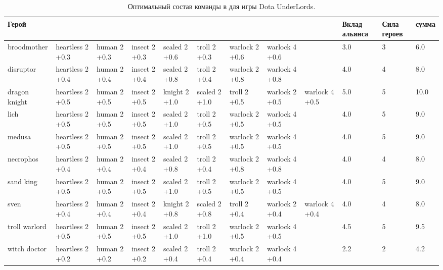 \documentclass{article}
\begin{document}
\begin{table}
\resizebox{16cm}{!} {
\begin{tabular}{l| *{8}{p{1.6cm}} | *{3}{ p{1cm}} }
{Герой} &                   &               &                &                &                &                  &                  &                  &  Вклад альянса &  Сила героев &   сумма \\
\midrule
broodmother   &  heartless 2 +0.3  &  human 2 +0.3  &  insect 2 +0.3  &  scaled 2 +0.6  &   troll 2 +0.3  &  warlock  2 +0.6  &  warlock  4 +0.6  &                   &                  3.0 &           3 &   6.0 \\
disruptor     &  heartless 2 +0.4  &  human 2 +0.4  &  insect 2 +0.4  &  scaled 2 +0.8  &   troll 2 +0.4  &  warlock  2 +0.8  &  warlock  4 +0.8  &                   &                  4.0 &           4 &   8.0 \\
dragon knight &  heartless 2 +0.5  &  human 2 +0.5  &  insect 2 +0.5  &  knight 2 +1.0  &  scaled 2 +1.0  &     troll 2 +0.5  &  warlock  2 +0.5  &  warlock  4 +0.5  &                  5.0 &           5 &  10.0 \\
lich          &  heartless 2 +0.5  &  human 2 +0.5  &  insect 2 +0.5  &  scaled 2 +1.0  &   troll 2 +0.5  &  warlock  2 +0.5  &  warlock  4 +0.5  &                   &                  4.0 &           5 &   9.0 \\
medusa        &  heartless 2 +0.5  &  human 2 +0.5  &  insect 2 +0.5  &  scaled 2 +1.0  &   troll 2 +0.5  &  warlock  2 +0.5  &  warlock  4 +0.5  &                   &                  4.0 &           5 &   9.0 \\
necrophos     &  heartless 2 +0.4  &  human 2 +0.4  &  insect 2 +0.4  &  scaled 2 +0.8  &   troll 2 +0.4  &  warlock  2 +0.8  &  warlock  4 +0.8  &                   &                  4.0 &           4 &   8.0 \\
sand king     &  heartless 2 +0.5  &  human 2 +0.5  &  insect 2 +0.5  &  scaled 2 +1.0  &   troll 2 +0.5  &  warlock  2 +0.5  &  warlock  4 +0.5  &                   &                  4.0 &           5 &   9.0 \\
sven          &  heartless 2 +0.4  &  human 2 +0.4  &  insect 2 +0.4  &  knight 2 +0.8  &  scaled 2 +0.8  &     troll 2 +0.4  &  warlock  2 +0.4  &  warlock  4 +0.4  &                  4.0 &           4 &   8.0 \\
troll warlord &  heartless 2 +0.5  &  human 2 +0.5  &  insect 2 +0.5  &  scaled 2 +1.0  &   troll 2 +1.0  &  warlock  2 +0.5  &  warlock  4 +0.5  &                   &                  4.5 &           5 &   9.5 \\
witch doctor  &  heartless 2 +0.2  &  human 2 +0.2  &  insect 2 +0.2  &  scaled 2 +0.4  &   troll 2 +0.4  &  warlock  2 +0.4  &  warlock  4 +0.4  &                   &                  2.2 &           2 &   4.2 \\
\bottomrule
\end{tabular}
}
\caption{Оптимальный состав команды в для игры Dota UnderLords. }
\label{table:solution}
\end{table}
\end{document}
